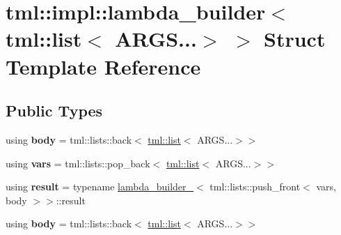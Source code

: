 \hypertarget{structtml_1_1impl_1_1lambda__builder_3_01tml_1_1list_3_01ARGS_8_8_8_4_01_4}{\section{tml\+:\+:impl\+:\+:lambda\+\_\+builder$<$ tml\+:\+:list$<$ A\+R\+G\+S...$>$ $>$ Struct Template Reference}
\label{structtml_1_1impl_1_1lambda__builder_3_01tml_1_1list_3_01ARGS_8_8_8_4_01_4}
}
\subsection*{Public Types}
\begin{DoxyCompactItemize}
\item 
\hypertarget{structtml_1_1impl_1_1lambda__builder_3_01tml_1_1list_3_01ARGS_8_8_8_4_01_4_a255a0138d291b6017e7e48b05c70b481}{using {\bfseries body} = tml\+::lists\+::back$<$ \hyperlink{structtml_1_1list}{tml\+::list}$<$ A\+R\+G\+S...$>$$>$}\label{structtml_1_1impl_1_1lambda__builder_3_01tml_1_1list_3_01ARGS_8_8_8_4_01_4_a255a0138d291b6017e7e48b05c70b481}

\item 
\hypertarget{structtml_1_1impl_1_1lambda__builder_3_01tml_1_1list_3_01ARGS_8_8_8_4_01_4_a517ba7f0c4a793e7e15a177395897b9e}{using {\bfseries vars} = tml\+::lists\+::pop\+\_\+back$<$ \hyperlink{structtml_1_1list}{tml\+::list}$<$ A\+R\+G\+S...$>$$>$}\label{structtml_1_1impl_1_1lambda__builder_3_01tml_1_1list_3_01ARGS_8_8_8_4_01_4_a517ba7f0c4a793e7e15a177395897b9e}

\item 
\hypertarget{structtml_1_1impl_1_1lambda__builder_3_01tml_1_1list_3_01ARGS_8_8_8_4_01_4_a36622880ba9a73f0aab116a22a6e4194}{using {\bfseries result} = typename \hyperlink{structtml_1_1impl_1_1lambda__builder__2}{lambda\+\_\+builder\+\_}$<$ tml\+::lists\+::push\+\_\+front$<$ vars, body $>$$>$\+::result}\label{structtml_1_1impl_1_1lambda__builder_3_01tml_1_1list_3_01ARGS_8_8_8_4_01_4_a36622880ba9a73f0aab116a22a6e4194}

\item 
\hypertarget{structtml_1_1impl_1_1lambda__builder_3_01tml_1_1list_3_01ARGS_8_8_8_4_01_4_a255a0138d291b6017e7e48b05c70b481}{using {\bfseries body} = tml\+::lists\+::back$<$ \hyperlink{structtml_1_1list}{tml\+::list}$<$ A\+R\+G\+S...$>$$>$}\label{structtml_1_1impl_1_1lambda__builder_3_01tml_1_1list_3_01ARGS_8_8_8_4_01_4_a255a0138d291b6017e7e48b05c70b481}


\end{DoxyCompactItemize}
